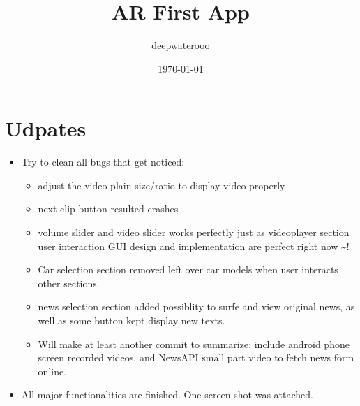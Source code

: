 \documentclass[9pt, b5paper]{article}
\author{deepwaterooo}
\date{\today}
\title{AR First App}
\begin{document}
\maketitle
\tableofcontents


\section{Udpates}
\label{sec-1}
\begin{itemize}
\item Try to clean all bugs that get noticed: 
\begin{itemize}
\item adjust the video plain size/ratio to display video properly
\item next clip button resulted crashes
\item volume slider and video slider works perfectly just as videoplayer section user interaction GUI design and implementation are perfect right now \textasciitilde{}!
\item Car selection section removed left over car models when user interacts other sections.
\item news selection section added possiblity to surfe and view original news, as well as some button kept display new texts.
\item Will make at least another commit to summarize: include android phone screen recorded videos, and NewsAPI small part video to fetch news form online.
\end{itemize}
\item All major functionalities are finished. One screen shot was attached. 


\end{itemize}
\end{document}
